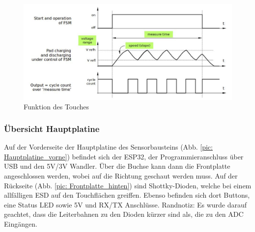 \begin{figure}[h!]
	\centering
	\includegraphics[width=1\textwidth]{graphics/touch_funktion.png}
	\caption{Funktion des Touches \cite{noauthor_touch_nodate}}
	\label{pic: touch_funktion}
\end{figure}

\subsubsection{Übersicht Hauptplatine}
Auf der Vorderseite der Hauptplatine des Sensorbausteins (Abb. \ref{pic: Hauptplatine_vorne}) befindet sich der ESP32, der Programmieranschluss über USB und den 5V/3V Wandler. Über die Buchse kann dann die Frontplatte angeschlossen werden, wobei auf die Richtung geschaut werden muss. Auf der Rückseite (Abb. \ref{pic: Frontplatte_hinten}) sind Shottky-Dioden, welche bei einem allfälligen ESD auf den Touchflächen greiffen. Ebenso befinden sich dort Buttons, eine Status LED sowie 5V und RX/TX Anschlüsse. Randnotiz: Es wurde darauf geachtet, dass die Leiterbahnen zu den Dioden kürzer sind als, die zu den ADC Eingängen.

